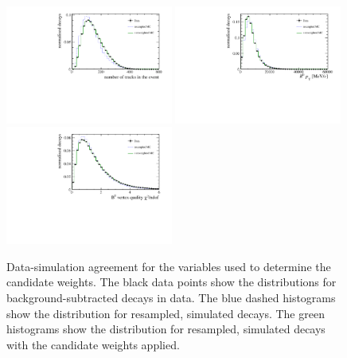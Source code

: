 \begin{figure}[!tb]
 \centering
 \includegraphics[width=0.49\textwidth]{figs/kpimm/data-mc/reweighting/nTracks.pdf}
 \includegraphics[width=0.49\textwidth]{figs/kpimm/data-mc/reweighting/B0_PT.pdf}
 \includegraphics[width=0.49\textwidth]{figs/kpimm/data-mc/reweighting/B0_VertexChi2.pdf}
 
 \caption{Data-simulation agreement for the variables used to determine the candidate weights. The black data points show the distributions for background-subtracted \BdToJPsiKst decays in data. The blue dashed histograms show the distribution for resampled, simulated \BdToJPsiKst decays. The green histograms show the distribution for resampled, simulated \BdToJPsiKst decays with the candidate weights applied.}
 \label{fig:data-mc:reweight}
\end{figure}
 
